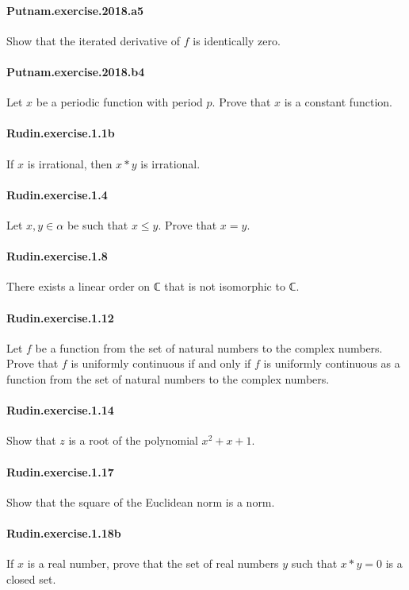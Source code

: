 \documentclass{article}
\begin{document}
\paragraph{Putnam.exercise.2018.a5} Show that the iterated
derivative of $f$ is identically zero.

\paragraph{Putnam.exercise.2018.b4} Let $x$ be a periodic function with period $p$. Prove that $x$ is a constant function.

\paragraph{Rudin.exercise.1.1b} If $x$ is irrational, then $x * y$ is irrational.

\paragraph{Rudin.exercise.1.4} Let $x, y ∈ α$ be such that $x ≤ y$. Prove that $x = y$.

\paragraph{Rudin.exercise.1.8} There exists a linear order on ℂ that is not isomorphic to ℂ.

\paragraph{Rudin.exercise.1.12} Let $f$ be a function from the set of natural numbers to the complex numbers. Prove that $f$ is uniformly continuous if and only if $f$ is uniformly continuous as a function from the set of natural numbers to the complex numbers.

\paragraph{Rudin.exercise.1.14} Show that $z$ is a root of the polynomial $x^2 + x + 1$.

\paragraph{Rudin.exercise.1.17} Show that the square of the Euclidean norm is a norm.

\paragraph{Rudin.exercise.1.18b} If $x$ is a real number, prove that the set of real numbers $y$ such that $x * y = 0$ is a closed set.
\end{document}

